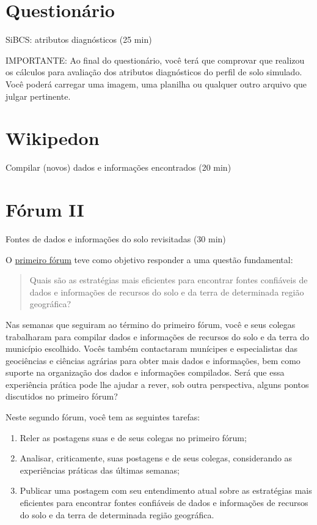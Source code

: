 \documentclass[
  11pt,
  a4paper,
  dvipsnames]{tufte-book}
\providecommand{\tightlist}{%
  \setlength{\itemsep}{0pt}\setlength{\parskip}{0pt}}
\begin{document}
\hypertarget{questionuxe1rio-5}{%
\section{Questionário}\label{questionuxe1rio-5}}

SiBCS: atributos diagnósticos (25 min)

IMPORTANTE: Ao final do questionário, você terá que comprovar que realizou os cálculos para avaliação dos atributos diagnósticos do perfil de solo simulado. Você poderá carregar uma imagem, uma planilha ou qualquer outro arquivo que julgar pertinente.

\hypertarget{wikipedon-5}{%
\section{Wikipedon}\label{wikipedon-5}}

Compilar (novos) dados e informações encontrados (20 min)

\hypertarget{fuxf3rum-ii}{%
\section{Fórum II}\label{fuxf3rum-ii}}

Fontes de dados e informações do solo revisitadas (30 min)

O \href{https://moodle.utfpr.edu.br/mod/forum/view.php?id=549655}{primeiro fórum} teve como objetivo responder a uma questão fundamental:

\begin{quote}
Quais são as estratégias mais eficientes para encontrar fontes confiáveis de dados e informações de recursos do solo e da terra de determinada região geográfica?
\end{quote}

Nas semanas que seguiram ao término do primeiro fórum, você e seus colegas trabalharam para compilar dados e informações de recursos do solo e da terra do município escolhido. Vocês também contactaram munícipes e especialistas das geociências e ciências agrárias para obter mais dados e informações, bem como suporte na organização dos dados e informações compilados. Será que essa experiência prática pode lhe ajudar a rever, sob outra perspectiva, alguns pontos discutidos no primeiro fórum?

Neste segundo fórum, você tem as seguintes tarefas:

\begin{enumerate}
\def\labelenumi{\arabic{enumi}.}
\tightlist
\item
  Reler as postagens suas e de seus colegas no primeiro fórum;
\item
  Analisar, criticamente, suas postagens e de seus colegas, considerando as experiências práticas das últimas semanas;
\item
  Publicar uma postagem com seu entendimento atual sobre as estratégias mais eficientes para encontrar fontes confiáveis de dados e informações de recursos do solo e da terra de determinada região geográfica.
\end{enumerate}
\end{document}
